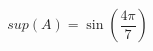 \documentclass[preview]{standalone}
\begin{document}
\begin{align*}
sup(A) = \sin\left(\dfrac{4\pi}{7}\right)
\end{align*}
\end{document}
